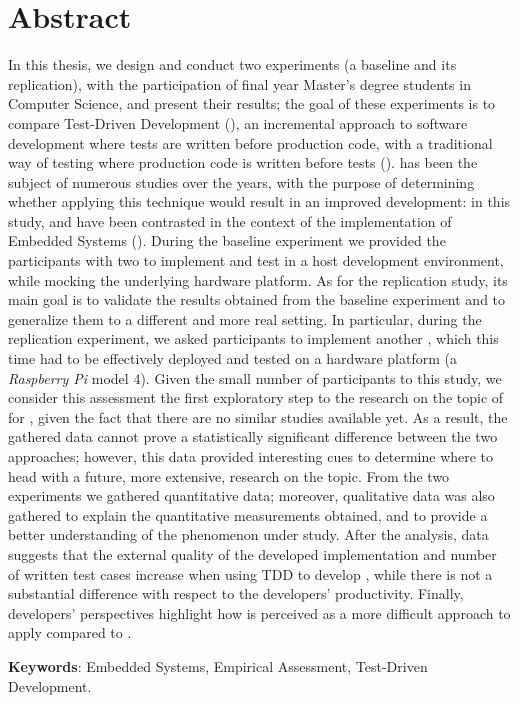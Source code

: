 \chapter*{Abstract}
In this thesis, we design and conduct two experiments (\ie a baseline and its replication), with the participation of final year Master's degree students in Computer Science, and present their results; the goal of these experiments is to compare Test-Driven Development (\tdd), an incremental approach to software development where tests are written before production code, with a traditional way of testing where production code is written before tests (\ie \notdd). 
\tdd has been the subject of numerous studies over the years, with the purpose of determining whether applying this technique would result in an improved development: in this study, \tdd and \notdd have been contrasted in the context of the implementation of Embedded Systems (\ess).
During the baseline experiment we provided the participants with two \ess to implement and test in a host development environment, while mocking the underlying hardware platform.
As for the replication study, its main goal is to validate the results obtained from the baseline experiment and to generalize them to a different and more real setting. 
In particular, during the replication experiment, we asked participants to implement another \es, which this time had to be effectively deployed and tested on a hardware platform (\ie a \textit{Raspberry Pi} model 4).
Given the small number of participants to this study, we consider this assessment the first exploratory step to the research on the topic of \tdd for \ess, given the fact that there are no similar studies available yet. As a result, the gathered data cannot prove a statistically significant difference between the two approaches; however, this data provided interesting cues to determine where to head with a future, more extensive, research on the topic.
From the two experiments we gathered quantitative data; moreover, qualitative data was also gathered to explain the quantitative measurements obtained, and to provide a better understanding of the phenomenon under study.
After the analysis, data suggests that the external quality of the developed implementation and number of written test cases increase when using TDD to develop \ess, while there is not a substantial difference with respect to the developers' productivity. 
Finally, developers' perspectives highlight how \tdd is perceived as a more difficult approach to apply compared to \notdd.

\noindent \textbf{Keywords}: Embedded Systems, Empirical Assessment, Test-Driven Development.